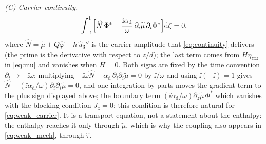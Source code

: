 \emph{(C) Carrier continuity.}
\begin{equation}
\label{eq:weak_carrier}
\int_{-1}^{1}\Bigl[\widehat N\,\Phi^{*}
+\frac{\mathrm{i}\alpha_{\mathrm d}}{\omega}\,\partial_i\widetilde\mu\,\partial_i\Phi^{*}\Bigr]\mathrm{d}\zeta=0 ,
\end{equation}
where $\widehat N=\widetilde\mu+Q\widehat\varphi-h\,\widehat u_3''$ is the carrier amplitude that
\eqref{eq:continuity} delivers (the prime is the derivative with respect to $z/d$); the last term
comes from $H\eta_{zzz}$ in \eqref{eq:mu} and vanishes when $H=0$.  Both signs are fixed by the time convention
$\partial_t\to-\ii\omega$: multiplying
$-\ii\omega\widehat N-\alpha_{\mathrm d}\,\partial_i\partial_i\widetilde\mu=0$
by $\ii/\omega$ and using $\ii(-\ii)=1$ gives
$\widehat N-(\ii\alpha_{\mathrm d}/\omega)\partial_i\partial_i\widetilde\mu=0$,
and one integration by parts moves the gradient term to the plus sign displayed above; the boundary term
$(\ii\alpha_{\mathrm d}/\omega)\partial_z\widetilde\mu\,\Phi^{*}$ which vanishes with the blocking condition $J_z=0$; this condition is therefore natural for \eqref{eq:weak_carrier}.  It is a transport
equation, not a statement about the enthalpy: the enthalpy reaches it only through
$\widetilde\mu$, which is why the coupling also appears in \eqref{eq:weak_mech},
through $\widehat\tau$.

